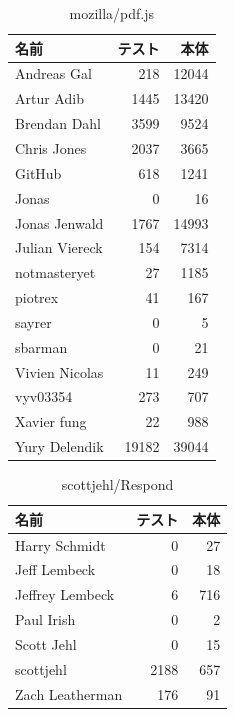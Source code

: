 \begin{table}[htb]
\begin{center}
\caption{mozilla/pdf.js}
\begin{tabular}{|l|r|r|} \hline 
名前 & テスト & 本体 \\ \hline \hline
Andreas Gal & 218 & 12044\\ \hline
Artur Adib & 1445 & 13420\\ \hline
Brendan Dahl & 3599 & 9524\\ \hline
Chris Jones & 2037 & 3665\\ \hline
GitHub & 618 & 1241\\ \hline
Jonas & 0 & 16\\ \hline
Jonas Jenwald & 1767 & 14993\\ \hline
Julian Viereck & 154 & 7314\\ \hline
notmasteryet & 27 & 1185\\ \hline
piotrex & 41 & 167\\ \hline
sayrer & 0 & 5\\ \hline
sbarman & 0 & 21\\ \hline
Vivien Nicolas & 11 & 249\\ \hline
vyv03354 & 273 & 707\\ \hline
Xavier fung & 22 & 988\\ \hline
Yury Delendik & 19182 & 39044\\ \hline
\end{tabular}
\end{center}
\end{table}

\begin{table}[htb]
\begin{center}
\caption{scottjehl/Respond}
\begin{tabular}{|l|r|r|} \hline 
名前 & テスト & 本体 \\ \hline \hline
Harry Schmidt & 0 & 27\\ \hline
Jeff Lembeck & 0 & 18\\ \hline
Jeffrey Lembeck & 6 & 716\\ \hline
Paul Irish & 0 & 2\\ \hline
Scott Jehl & 0 & 15\\ \hline
scottjehl & 2188 & 657\\ \hline
Zach Leatherman & 176 & 91\\ \hline
\end{tabular}
\end{center}
\end{table}

